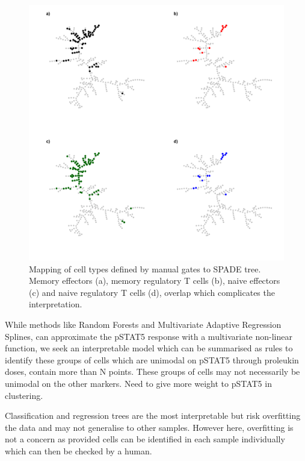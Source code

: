 \begin{figure}[h]
    \centering
    \includegraphics[scale=.5]{IL2/figures/spade-celltypes.pdf}
    {Mapping of cell types defined by manual gates to SPADE tree.}
    {
      Memory effectors (a), memory regulatory T cells (b), naive effectors (c) and naive regulatory T cells (d), overlap which complicates
      the interpretation.
    }
\end{figure}



While methods like Random Forests and Multivariate Adaptive Regression Splines, can approximate the pSTAT5 response with a multivariate non-linear function,
we seek an interpretable model which can be summarised as rules to identify these groups of cells
which are unimodal on pSTAT5 through proleukin doses, contain more than N points.
These groups of cells may not necessarily be unimodal on the other markers.
Need to give more weight to pSTAT5 in clustering.

Classification and regression trees are the most interpretable but risk overfitting the data and may not generalise to other samples.
However here, overfitting is not a concern as provided cells can be identified in each sample individually which can then be checked by a human.



